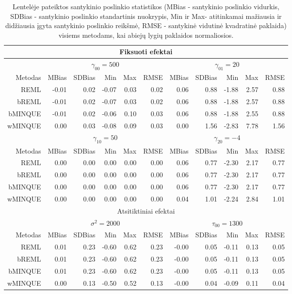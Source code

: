 \documentclass[12pt,a4paper]{article}
\begin{document}
\begin{small}
\begin{table}[ht]
\caption{Lentelėje pateiktos santykinio poslinkio statistikos (MBias - santykinio poslinkio vidurkis, SDBias - santykinio poslinkio standartinis nuokrypis, Min ir Max- atitinkamai mažiausia ir didžiausia įgyta santykinio poslinkio reikšmė, RMSE - santykinė vidutinė kvadratinė paklaida) visiems metodams, kai abiejų lygių paklaidos normaliosios.}
\label{table:y1}
\centering
\begin{tabular}{r|rrrrr|rrrrr|}
\hline
\multicolumn{11}{c}{Fiksuoti efektai}\\
\hline
& \multicolumn{5}{c|}{$\gamma_{00} = 500$}&\multicolumn{5}{c|}{$\gamma_{01} = 20$}\\
\hline
Metodas & MBias & SDBias & Min & Max & RMSE & MBias & SDBias & Min & Max & RMSE\\
\hline
REML & -0.01 & 0.02 & -0.07 & 0.03 & 0.02& 0.06 & 0.88 & -1.88 & 2.57 & 0.88 \\
bREML & -0.01 & 0.02 & -0.07 & 0.03 & 0.02& 0.06 & 0.88 & -1.88 & 2.57 & 0.88 \\
bMINQUE & -0.01 & 0.02 & -0.06 & 0.10 & 0.03& 0.06 & 0.88 & -1.88 & 2.55 & 0.88\\
wMINQUE & 0.00 & 0.03 & -0.08 & 0.09 & 0.03& 0.00 & 1.56 & -2.83 & 7.78 & 1.56\\
\hline
& \multicolumn{5}{c|}{$\gamma_{10} = 50$}&\multicolumn{5}{c|}{$\gamma_{20} = -4$}\\
\hline
Metodas & MBias & SDBias & Min & Max & RMSE & MBias & SDBias & Min & Max & RMSE\\
\hline
REML & 0.00 & 0.00 & 0.00 & 0.00 & 0.00& 0.06 & 0.77 & -2.30 & 2.17 & 0.77\\
bREML &0.00 & 0.00 & 0.00 & 0.00 & 0.00& 0.06 & 0.77 & -2.30 & 2.17 & 0.77\\
bMINQUE &0.00 & 0.00 & 0.00 & 0.00 & 0.00& 0.06 & 0.77 & -2.30 & 2.17 & 0.77\\
wMINQUE &0.00 & 0.00 & 0.00 & 0.00 & 0.00& 0.04 & 1.01 & -2.24 & 2.84 & 1.01\\
\hline
\multicolumn{11}{c}{Atsitiktiniai efektai}\\
\hline
& \multicolumn{5}{c|}{$\sigma^2=2000$}&\multicolumn{5}{c|}{$\tau_{00}=1300$}\\
\hline
Metodas & MBias & SDBias & Min & Max & RMSE & MBias & SDBias & Min & Max & RMSE\\
\hline
REML &0.01 & 0.23 & -0.60 & 0.62 & 0.23& -0.00 & 0.05 & -0.11 & 0.13 & 0.05\\
bREML & 0.01 & 0.23 & -0.60 & 0.62 & 0.23& -0.00 & 0.05 & -0.11 & 0.13 & 0.05\\
bMINQUE & 0.01 & 0.23 & -0.60 & 0.62 & 0.23& -0.00 & 0.05 & -0.11 & 0.13 & 0.05\\
wMINQUE & 0.00 & 0.13 & -0.50 & 0.52 & 0.13& -0.00 & 0.04 & -0.09 & 0.11 & 0.04\\
\hline
\end{tabular}
\end{table}
\end{small}
\end{document}
